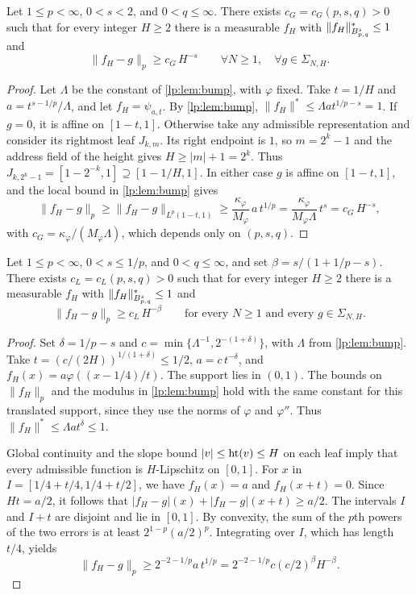 \documentclass[11pt,a4paper]{article}
\begin{document}
\begin{proposicao}
\label{lp:prop:geom-floor}
Let $1\le p<\infty$, $0<s<2$, and $0<q\le\infty$. There exists $c_G=c_G(p,s,q)>0$ such that for every integer $H\ge2$ there is a measurable $f_H$ with $\|f_H\|^*_{B^{s}_{p,q}}\le1$ and
\[
 \|f_H-g\|_p\ge c_G\,H^{-s}\qquad \forall N\ge1,\quad \forall g\in\Sigma_{N,H}.
\]
\end{proposicao}

\begin{proof}
Let $\Lambda$ be the constant of \cref{lp:lem:bump}, with $\varphi$ fixed. Take $t=1/H$ and $a=t^{s-1/p}/\Lambda$, and let $f_H=\psi_{a,t}$. By \cref{lp:lem:bump}, $\|f_H\|^*\le\Lambda a t^{1/p-s}=1$. If $g=0$, it is affine on $[1-t,1]$. Otherwise take any admissible representation and consider its rightmost leaf $J_{k,m}$. Its right endpoint is $1$, so $m=2^k-1$ and the address field of the height gives $H\ge |m|+1=2^k$. Thus $J_{k,2^k-1}=[1-2^{-k},1]\supseteq[1-1/H,1]$. In either case $g$ is affine on $[1-t,1]$, and the local bound in \cref{lp:lem:bump} gives
\[
 \|f_H-g\|_p\ge\|f_H-g\|_{L^p(1-t,1)}\ge\frac{\kappa_\varphi}{M_\varphi}\,a\,t^{1/p}=\frac{\kappa_\varphi}{M_\varphi\Lambda}\,t^{s}=c_G\,H^{-s},
\]
with $c_G=\kappa_\varphi/(M_\varphi\Lambda)$, which depends only on $(p,s,q)$.
\end{proof}

\begin{proposicao}
\label{lp:prop:slope-floor}
Let $1\le p<\infty$, $0<s\le1/p$, and $0<q\le\infty$, and set $\beta=s/(1+1/p-s)$. There exists $c_L=c_L(p,s,q)>0$ such that for every integer $H\ge2$ there is a measurable $f_H$ with $\|f_H\|^*_{B^{s}_{p,q}}\le1$ and
\[
 \|f_H-g\|_p\ge c_L\,H^{-\beta}\qquad\text{for every }N\ge1\text{ and every }g\in\Sigma_{N,H}.
\]
\end{proposicao}

\begin{proof}
Set $\delta=1/p-s$ and $c=\min\{\Lambda^{-1},2^{-(1+\delta)}\}$, with $\Lambda$ from \cref{lp:lem:bump}. Take $t=(c/(2H))^{1/(1+\delta)}\le1/2$, $a=c\,t^{-\delta}$, and $f_H(x)=a\varphi((x-1/4)/t)$. The support lies in $(0,1)$. The bounds on $\|f_H\|_p$ and the modulus in \cref{lp:lem:bump} hold with the same constant for this translated support, since they use the norms of $\varphi$ and $\varphi''$. Thus $\|f_H\|^*\le\Lambda a t^\delta\le1$.

Global continuity and the slope bound $|v|\le\operatorname{ht}(v)\le H$ on each leaf imply that every admissible function is $H$-Lipschitz on $[0,1]$. For $x$ in $I=[1/4+t/4,1/4+t/2]$, we have $f_H(x)=a$ and $f_H(x+t)=0$. Since $Ht=a/2$, it follows that $|f_H-g|(x)+|f_H-g|(x+t)\ge a/2$. The intervals $I$ and $I+t$ are disjoint and lie in $[0,1]$. By convexity, the sum of the $p$th powers of the two errors is at least $2^{1-p}(a/2)^p$. Integrating over $I$, which has length $t/4$, yields
\[
 \|f_H-g\|_p\ge 2^{-2-1/p}a\,t^{1/p}
 =2^{-2-1/p}c(c/2)^\beta H^{-\beta}.
\]
\end{proof}
\end{document}
